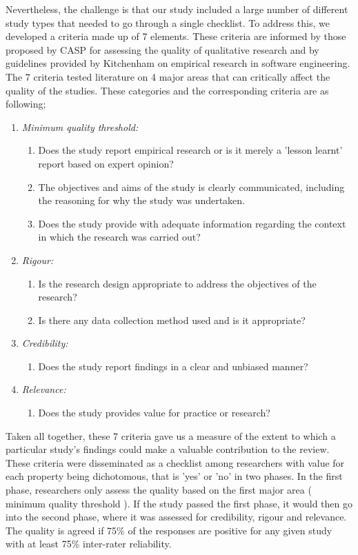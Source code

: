 \documentclass{ieeeaccess}
\begin{document}
Nevertheless, the challenge is that our study included a large number of different study types that needed to go through a single checklist. To address this, we developed a criteria made up of 7 elements. These criteria are informed by those proposed by CASP for assessing the quality of qualitative research \cite{tools2018checklists} and by guidelines provided by Kitchenham \cite{kitchenham2002preliminary} on empirical research in software engineering. The 7 criteria tested literature on 4 major areas that can critically affect the quality of the studies. These categories and the corresponding criteria are as following;

\begin{enumerate}
    \item \emph{Minimum quality threshold:} 
    \begin{enumerate}
        \item Does the study report empirical research or is it merely a 'lesson learnt' report based on expert opinion?
        \item The objectives and aims of the study is clearly communicated, including the reasoning for why the study was undertaken.
        \item Does the study provide with adequate information regarding the context in which the research was carried out?
    \end{enumerate}
    \item \emph{Rigour:}
    \begin{enumerate}
        \item Is the research design appropriate to address the objectives of the research?
        \item Is there any data collection method used and is it appropriate?
    \end{enumerate}
    \item \emph{Credibility:}
      \begin{enumerate}
        \item Does the study report findings in a clear and unbiased manner? 
     \end{enumerate}
    \item \emph{Relevance:}
    \begin{enumerate}
        \item Does the study provides value for practice or research? 
     \end{enumerate}
\end{enumerate}

Taken all together, these 7 criteria gave us a measure of the extent to which a particular study's findings could make a valuable contribution to the review. These criteria were disseminated as a checklist among researchers with value for each property being dichotomous, that is 'yes' or 'no' in two phases. In the first phase, researchers only assess the quality based on the first major area ( minimum quality threshold ). If the study passed the first phase, it would then go into the second phase, where it was assessed for credibility, rigour and relevance. The quality is agreed if 75\% of the responses are positive for any given study with at least 75\% inter-rater reliability. 
\end{document}
